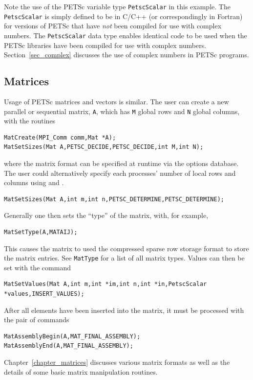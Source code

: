 Note the use of the PETSc variable type \lstinline{PetscScalar} in this example.
The \lstinline{PetscScalar} is simply defined to be  in C/C++
(or correspondingly   in Fortran) for versions of
PETSc that have {\em not} been compiled for use with complex numbers.
The \lstinline{PetscScalar} data type enables
identical code to be used when the PETSc libraries have been compiled
for use with complex numbers.  Section~\ref{sec_complex} discusses the
use of complex numbers in PETSc programs.

\subsection*{Matrices}
\label{sec_matintro}
Usage of PETSc matrices and vectors is similar. 
The user can create a new parallel or sequential matrix, \lstinline{A}, which
has \lstinline{M} global rows and \lstinline{N} global columns, with the routines
\begin{lstlisting}
MatCreate(MPI_Comm comm,Mat *A);
MatSetSizes(Mat A,PETSC_DECIDE,PETSC_DECIDE,int M,int N);
\end{lstlisting}
where the matrix format can be specified at runtime via the options database.  The user could
alternatively specify each processes' number of local rows and columns
using  and .
\begin{lstlisting}
MatSetSizes(Mat A,int m,int n,PETSC_DETERMINE,PETSC_DETERMINE);
\end{lstlisting}
Generally one then sets the ``type'' of the matrix, with, for example,
\begin{lstlisting}
MatSetType(A,MATAIJ);
\end{lstlisting}
This causes the matrix  to used the compressed sparse row storage format to store the
matrix entries. See \lstinline{MatType} for a list of all matrix types.
Values can then be set with the command
\begin{lstlisting}
MatSetValues(Mat A,int m,int *im,int n,int *in,PetscScalar *values,INSERT_VALUES);
\end{lstlisting}
After all elements have been inserted into the
matrix, it must be processed with the pair of commands
\begin{lstlisting}
MatAssemblyBegin(A,MAT_FINAL_ASSEMBLY);
MatAssemblyEnd(A,MAT_FINAL_ASSEMBLY);
\end{lstlisting}
Chapter~\ref{chapter_matrices} discusses various matrix formats as
well as the details of some basic matrix manipulation routines.

